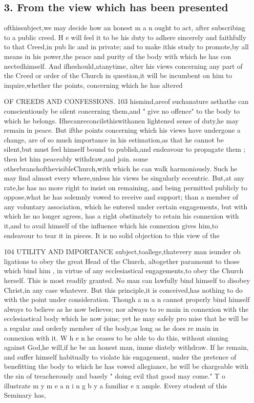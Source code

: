 \documentclass[
]{book}
\begin{document}
\hypertarget{from-the-view-which-has-been-presented}{%
\subsection{3. From the view which has been presented}\label{from-the-view-which-has-been-presented}}

ofthissubject,we may decide how an honest m a n ought to act, after subscribing to a public creed. H e will feel it to be his duty to adhere
sincerely and faithfully to that Creed,in pub
lic and in private; and to make ithis study to
promote,by all means in his power,the peace
and purity of the body with which he has con nectedhimself. And ifheshould,atanytime,
alter his views concerning any part of the Creed or order of the Church in question,it
will be incumbent on him to inquire,whether the points, concerning which he has altered

OF CREEDS AND CONFESSIONS. 103
hismind,areof suchanature asthathe can conscientiously be silent concerning them,and
" give no offence" to the body to which he belongs. Ifhecanreconcilethiswithanen
lightened sense of duty,he may remain in peace. But ifthe points concerning which his views have undergone a change, are of so much importance in his estimation,as that he cannot be silent,but must feel himself bound to publish,and endeavour to propagate them ; then let him peaceably withdraw,and join. some otherbranchofthevisibleChurch,with which he can walk harmoniously. Such he may find almost every where,unless his views
be singularly eccentric. But,at any rate,he has no more right to insist on remaining, and being permitted publicly to oppose,what he has solemnly vowed to receive and support; than a member of any voluntary association, which he entered under certain engagements, but with which he no longer agrees, has a
right obstinately to retain his connexion with
it,and to avail himself of the influence which
his connexion gives him,to endeavour to tear it in pieces.
It is no solid objection to this view of the

104 UTILITY AND IMPORTANCE
subject,toallege,thatevery man isunder ob ligations to obey the great Head of the Church, altogether paramount to those which bind him , in virtue of any ecclesiastical engagements,to
obey the Church herself. This is most readily granted. No man can lawfully bind himself
to disobey Christ,in any case whatever. But
this principle,it is conceived,has nothing to do with the point under consideration. Though a m a n cannot properly bind himself always to believe as he now believes; nor always to re main in connexion with the ecclesiastical body which he now joins; yet he may safely pro mise that he will be a regular and orderly
member of the body,as long as he does re main in connexion with it. W h e n he ceases
to be able to do this, without sinning against
God,he will,if he be an honest man, imme
diately withdraw. If he remain, and suffer himself habitually to violate his engagement,
under the pretence of benefitting the body to which he has vowed allegiance, he will be chargeable with the sin of treacherously and basely " doing evil that good may come."
T o illustrate m y m e a n i n g b y a familiar e x ample. Every student of this Seminary has,
\end{document}
